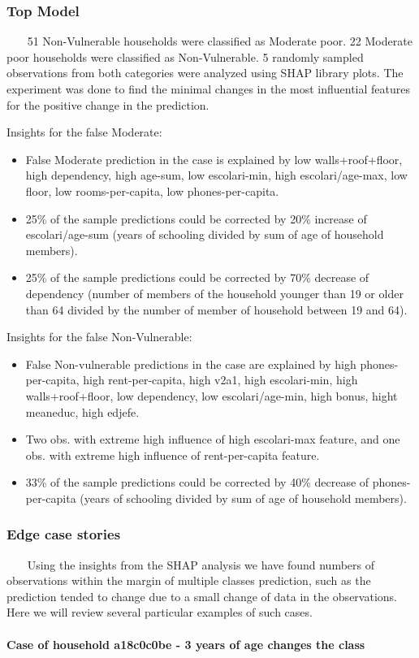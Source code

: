     \subsubsection{Top Model}~~~
        51 Non-Vulnerable households were classified as Moderate poor. 22 Moderate poor households were classified as Non-Vulnerable. 5 randomly sampled observations from both categories were analyzed using SHAP library plots. The experiment was done to find the minimal changes in the most influential features for the positive change in the prediction.
        
        Insights for the false Moderate:
        \begin{itemize}
            \item False Moderate prediction in the case is explained by low walls+roof+floor, high dependency, high age-sum, low escolari-min, high escolari/age-max, low floor, low rooms-per-capita, low phones-per-capita.
            \item 25\% of the sample predictions could be corrected by 20\% increase of escolari/age-sum (years of schooling divided by sum of age of household members). 
            \item 25\% of the sample predictions could be corrected by 70\% decrease of dependency (number of members of the household younger than 19 or older than 64 divided by the number of member of household between 19 and 64). 

        \end{itemize}
        Insights for the false Non-Vulnerable:
        \begin{itemize}
            \item False Non-vulnerable predictions in the case are explained by high phones-per-capita, high rent-per-capita, high v2a1, high escolari-min, high walls+roof+floor, low dependency, low escolari/age-min, high bonus, hight meaneduc, high edjefe.
            \item Two obs. with extreme high influence of high escolari-max feature, and one obs. with extreme high influence of rent-per-capita feature.
            \item 33\% of the sample predictions could be corrected by 40\% decrease of phones-per-capita (years of schooling divided by sum of age of household members). 
        \end{itemize}

    \subsubsection{Edge case stories}~~~
	Using the insights from the SHAP analysis we have found numbers of observations within the margin of multiple classes prediction, such as the prediction tended to change due to a small change of data in the observations. Here we will review several particular examples of such cases.\\
	\\
\textbf{Case of household a18c0c0be - 3 years of age changes the class}\\

